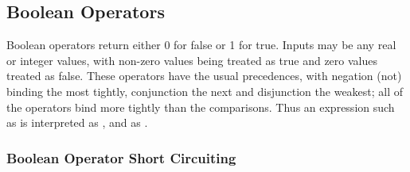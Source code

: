 \begin{description}
\begin{description}
\begin{description}
\begin{description}
\begin{description}
\begin{description}
\begin{description}
\subsection{Boolean Operators}

Boolean operators return either 0 for false or 1 for true.  Inputs may be any real or integer values, with non-zero values being treated as true and zero values treated as false.  These operators have the usual precedences, with negation (not) binding the most tightly, conjunction the next and disjunction the weakest; all of the operators bind more tightly than the comparisons.  Thus an expression such as  is interpreted as , and  as .

\begin{description}   %



\subsubsection{Boolean Operator Short Circuiting}


\end{description}
\end{description}
\end{description}
\end{description}
\end{description}
\end{description}
\end{description}
\end{description}
